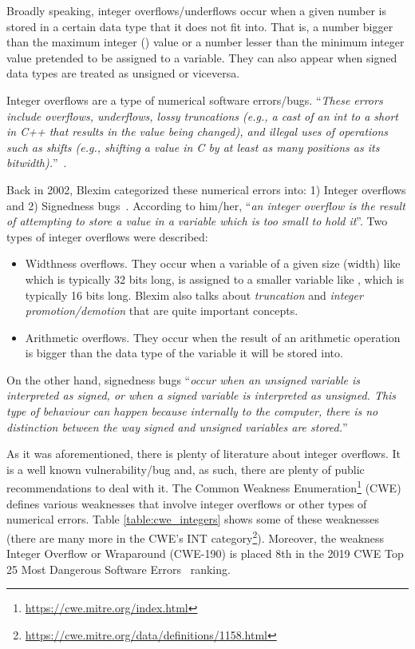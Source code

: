 Broadly speaking, integer overflows/underflows occur when a given number is stored in a certain data type that it does not fit into. That is, a number bigger than the maximum integer () value or a number lesser than the minimum integer value pretended to be assigned to a  variable. They can also appear when signed data types are treated as unsigned or viceversa. 

Integer overflows are a type of numerical software errors/bugs. ``\textit{These errors include
overflows, underflows, lossy truncations (e.g., a cast of an
int to a short in C++ that results in the value being
changed), and illegal uses of operations such as shifts (e.g.,
shifting a value in C by at least as many positions as its
bitwidth).}''~\cite{dietz2015understanding}.

Back in 2002, Blexim categorized these numerical errors into: 1) Integer overflows and 2) Signedness bugs~\cite{Blexim2002}. According to him/her, ``\textit{an integer overflow is the result of attempting to store a value in a variable which is too small to hold it}''. Two types of integer overflows were described:
\begin{itemize}
	\item{Widthness overflows. They occur when a variable of a given size (width) like  which is typically 32 bits long, is assigned to a smaller variable like , which is typically 16 bits long. Blexim also talks about \textit{truncation} and \textit{integer promotion/demotion} that are quite important concepts. }
	\item{Arithmetic overflows. They occur when the result of an arithmetic operation is bigger than the data type of the variable it will be stored into.}
\end{itemize}

On the other hand, signedness bugs ``\textit{occur when an unsigned variable is interpreted as signed, or when a signed variable is interpreted as unsigned.  This type of behaviour can happen because internally to the computer, there is no distinction between the way signed and unsigned variables are stored.}''

As it was aforementioned, there is plenty of literature about integer overflows. It is a well known vulnerability/bug and, as such, there are plenty of public recommendations to deal with it. The Common Weakness Enumeration\footnote{\url{https://cwe.mitre.org/index.html}} (CWE)   defines various weaknesses that involve integer overflows or other types of numerical errors. Table \ref{table:cwe_integers} shows some of these weaknesses (there are many more in the CWE's INT category\footnote{\url{https://cwe.mitre.org/data/definitions/1158.html}}). Moreover, the weakness Integer Overflow or Wraparound (CWE-190) is placed 8th in the 2019 CWE Top 25 Most Dangerous Software Errors~\cite{Top25CWE2019} ranking.

